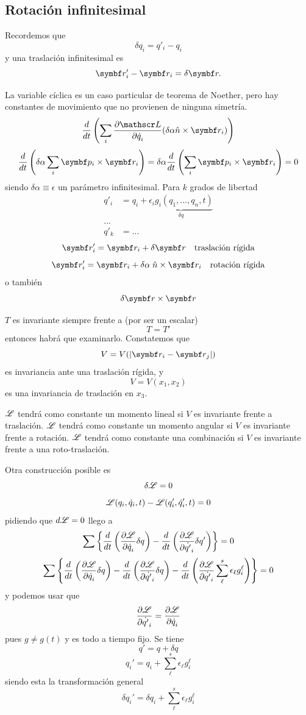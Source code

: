 \documentclass[10pt,oneside]{CBFT_book}
\begin{document}
\subsection{Rotación infinitesimal}


Recordemos que 
\[
	\delta q_i = q'_i - q_i 
\]
y una traslación infinitesimal es 
\[
	\vb{r}_i' - \vb{r}_i = \delta \vb{r}. 
\]

La variable cíclica es un caso particular de teorema de Noether, pero hay constantes de movimiento que 
no provienen de ninguna simetría.
\[
	\frac{d}{dt}\left( \sum_i \dpar{\Lag}{\dot{q}_i} ( \delta \alpha \hat{n}\times \vb{r}_i ) \right) 
\]
\[
	\frac{d}{dt}\left( \delta\alpha \sum_i \vb{p}_i \times \vb{r}_i  \right) =
	\delta\alpha \frac{d}{dt}\left(  \sum_i \vb{p}_i \times \vb{r}_i  \right) = 0
\]
siendo $\delta \alpha \equiv \epsilon$ un parámetro infinitesimal.
Para $k$ grados de libertad
\begin{align*}
	q'_i &= q_i + \underbrace{\epsilon_i g_i(q_1,...,q_n,t)}_{\delta q} \\
	... \\
	q'_k &= ...
\end{align*}
\[
	\vb{r}_i' = \vb{r}_i + \delta\vb{r} \quad \textrm{traslación rígida}
\]
\[
	\vb{r}_i' = \vb{r}_i + \delta\alpha \; \hat{n}\times\vb{r}_i \quad \textrm{rotación rígida}
\]
o también 
\[
	\delta \vb{r} \times \vb{r}
\]

$T$ es invariante siempre frente a (por ser un escalar)
\[
	T = T' 
\]
entonces habrá que examinarlo.
Constatemos que 
\[
	V = V(|\vb{r}_i - \vb{r}_j|)
\]
es invariancia ante una traslación rígida, y
\[
	V = V(x_1,x_2)
\]
es una invariancia de traslación en $x_3$.

$\mathscr{L}$ tendrá como constante un momento lineal si $V$ es invariante frente a traslación.
$\mathscr{L}$ tendrá como constante un momento angular si $V$ es invariante frente a rotación.
$\mathscr{L}$ tendrá como constante una combinación si $V$ es invariante frente a una roto-traslación.

Otra construcción posible es 
\[
	\delta \mathscr{L} = 0
\]
\[
	\mathscr{L}( q_i , \dot{q}_i, t ) - \mathscr{L}(q_i' , \dot{q}_i' , t) = 0 
\]
pidiendo que $d\mathscr{L} = 0$ llego a 
\[
	\sum \left\{ \frac{d}{dt}\left( \frac{\partial^{\hspace{-0.05em}} {\mathscr{L}}}{\partial {\dot{q}_i}^{\hspace{-0.05em}}} \delta q \right) - 
	\frac{d}{dt}\left( \frac{\partial^{\hspace{-0.05em}} {\mathscr{L}}}{\partial {\dot{q'}_i}^{\hspace{-0.05em}}} \delta q' \right)  \right\} = 0
\]
\[
	\sum \left\{ \frac{d}{dt}\left( \frac{\partial^{\hspace{-0.05em}} {\mathscr{L}}}{\partial {\dot{q}_i}^{\hspace{-0.05em}}} \delta q \right) - 
	\frac{d}{dt}\left( \frac{\partial^{\hspace{-0.05em}} {\mathscr{L}}}{\partial {\dot{q'}_i}^{\hspace{-0.05em}}} \delta q \right) -
	\frac{d}{dt}\left( \frac{\partial^{\hspace{-0.05em}} {\mathscr{L}}}{\partial {\dot{q'}_i}^{\hspace{-0.05em}}} \sum_\ell^s \epsilon_\ell g_i^\ell \right) \right\} = 0
\]
y podemos usar que 
\[
	\frac{\partial^{\hspace{-0.05em}} {\mathscr{L}}}{\partial {\dot{q'}_i}^{\hspace{-0.05em}}} = \frac{\partial^{\hspace{-0.05em}} {\mathscr{L}}}{\partial {\dot{q}_i}^{\hspace{-0.05em}}}
\]
pues $g\neq g(t)$ y es todo a tiempo fijo. Se tiene 
\[
	q' = q + \delta q
\]
\[
	q_i' = q_i + \sum_\ell^s \epsilon_\ell g_i^\ell
\]
siendo esta la transformación general
\[
	\delta q_i' = \delta q_i + \sum_\ell^s \epsilon_\ell g_i^\ell
\]
\end{document}
